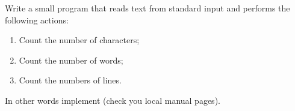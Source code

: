 \begin{Exercise}[title={Word and letter count},difficulty=5]
\label{ex:wc}
\Question\label{ex:wc q1} Write a small program that reads text from
standard input and performs the following actions:
\begin{enumerate}
\item{Count the number of characters;}
\item{Count the number of words;}
\item{Count the numbers of lines.}
\end{enumerate}
In other words implement  (check you local manual pages).
\end{Exercise}

\begin{Answer}
\Question 
\end{Answer}
